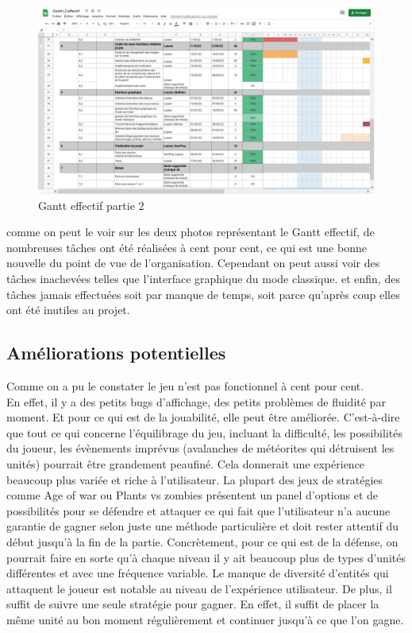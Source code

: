 \documentclass[a4paper,11pt]{article}
\begin{document}
 \smallbreak
\begin{figure}[h!]
\centering
\includegraphics [width=1\textwidth]{image8.jpg} 
\caption {\label{image} Gantt effectif partie 2}
\end{figure}
 \smallbreak
comme on peut le voir sur les deux photos représentant le Gantt effectif, 
de nombreuses tâches ont été réalisées à cent pour cent, ce qui est une bonne nouvelle
du point de vue de l'organisation. Cependant on peut aussi voir des tâches inachevées telles que l'interface graphique du mode classique.
et enfin, des tâches jamais effectuées soit par manque de temps, soit parce qu'après coup elles ont été
inutiles au projet.


\subsection{Améliorations potentielles}
Comme on a pu le constater le jeu n'est pas fonctionnel à cent pour cent.\\
En effet, il y a des petits bugs d'affichage, des petits problèmes de fluidité par moment.
Et pour ce qui est de la jouabilité, elle peut être améliorée. C'est-à-dire que tout ce qui concerne l'équilibrage du
jeu, incluant la difficulté, les possibilités du joueur, les évènements imprévus (avalanches de météorites qui détruisent les unités) 
pourrait être grandement peaufiné. Cela donnerait une expérience beaucoup plus variée et riche à l'utilisateur. La plupart des
jeux de stratégies comme Age of war ou Plants vs zombies présentent un panel d'options et de possibilités pour se défendre et attaquer
ce qui fait que l'utilisateur n'a aucune garantie de gagner selon juste une méthode particulière et doit rester attentif 
du début jusqu'à la fin de la partie. Concrètement, pour ce qui est de la défense, on pourrait faire en sorte qu'à chaque niveau il y ait
beaucoup plus de types d'unités différentes et avec une fréquence variable. Le manque de diversité d'entités qui attaquent le joueur est
notable au niveau de l'expérience utilisateur. De plus, il suffit de suivre une seule stratégie pour gagner. En effet,
il suffit de placer la même unité au bon moment régulièrement et continuer jusqu'à ce que l'on gagne.\\
\end{document}

